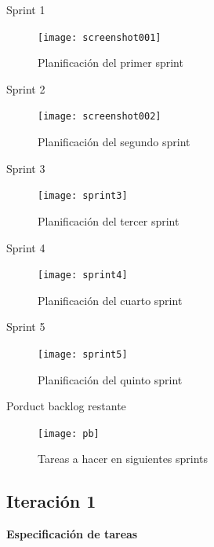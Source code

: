 Sprint 1 \\ 
\begin{figure}[H]
	\centering
	\texttt{[image: screenshot001]}
	\caption{Planificación del primer sprint}
	\label{fig:sprint1}
\end{figure}


Sprint 2 \\
\begin{figure}[H]
	\centering
	\texttt{[image: screenshot002]}
	\caption{Planificación del segundo sprint}
	\label{fig:sprint2}
\end{figure} 


Sprint 3 \\ 
\begin{figure}[H]
	\centering
	\texttt{[image: sprint3]}
	\caption{Planificación del tercer sprint}
	\label{fig:sprint3}
\end{figure}

Sprint 4 \\
\begin{figure}[H]
	\centering
	\texttt{[image: sprint4]}
	\caption{Planificación del cuarto sprint}
	\label{fig:sprint4}
\end{figure}

Sprint 5 \\ 
\begin{figure}[H]
	\centering
	\texttt{[image: sprint5]}
	\caption{Planificación del quinto sprint}
	\label{fig:sprint5}
\end{figure}

Porduct backlog restante \\
\begin{figure}[H]
	\centering
	\texttt{[image: pb]}
	\caption{Tareas a hacer en siguientes sprints}
	\label{fig:pb_restante}
\end{figure}





\subsection{Iteración 1}

\large{\textbf{Especificación de tareas}} \\



